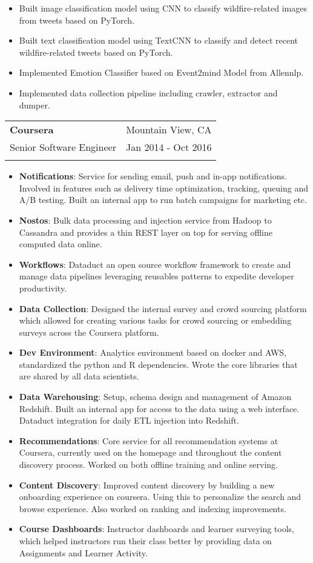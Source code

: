 \documentclass[letterpaper,11pt]{article}
\makeatletter
\newcommand{\resumeItem}[2]{
  \item\small{
    \textbf{#1}{: #2 \vspace{-2pt}}
  }
}
\newcommand{\resumeSubheading}[6]{
  \vspace{-1pt}\item
    \begin{tabular*}{0.97\textwidth}[t]{l@{\extracolsep{\fill}}r}
      \textbf{#1} & #2 \\
      #3 & #4 \\
      \textbf{\textit{#5}} & \textbf{\textit{#6}} \\
    \end{tabular*}\vspace{-5pt}
}
\newcommand{\resumeItemListStart}{\begin{itemize}}
\newcommand{\resumeItemListEnd}{\end{itemize}\vspace{-5pt}}
\makeatother
\begin{document}
        \begin{itemize}
          \item Built image classification model using CNN to classify wildfire-related images from tweets based on PyTorch.
          \item Built text classification model using TextCNN to classify and detect recent wildfire-related tweets based on PyTorch.
          \item Implemented Emotion Classifier based on Event2mind Model from Allennlp.
          \item Implemented data collection pipeline including crawler, extractor and dumper.
        \end{itemize}


    \resumeSubheading
      {Coursera}{Mountain View, CA}
      {Senior Software Engineer}{Jan 2014 - Oct 2016}
      {}{}
      \resumeItemListStart
        \resumeItem{Notifications}
          {Service for sending email, push and in-app notifications. Involved in features such as delivery time optimization, tracking, queuing and A/B testing. Built an internal app to run batch campaigns for marketing etc.}
        \resumeItem{Nostos}
          {Bulk data processing and injection service from Hadoop to Cassandra and provides a thin REST layer on top for serving offline computed data online.}
        \resumeItem{Workflows}
          {Dataduct an open source workflow framework to create and manage data pipelines leveraging reusables patterns to expedite developer productivity.}
        \resumeItem{Data Collection}
          {Designed the internal survey and crowd sourcing platform which allowed for creating various tasks for crowd sourcing or embedding surveys across the Coursera platform.}
        \resumeItem{Dev Environment}
          {Analytics environment based on docker and AWS, standardized the python and R dependencies. Wrote the core libraries that are shared by all data scientists.}
        \resumeItem{Data Warehousing}
          {Setup, schema design and management of Amazon Redshift. Built an internal app for access to the data using a web interface. Dataduct integration for daily ETL injection into Redshift.}
        \resumeItem{Recommendations}
          {Core service for all recommendation systems at Coursera, currently used on the homepage and throughout the content discovery process. Worked on both offline training and online serving.}
        \resumeItem{Content Discovery}
          {Improved content discovery by building a new onboarding experience on coursera. Using this to personalize the search and browse experience. Also worked on ranking and indexing improvements.}
        \resumeItem{Course Dashboards}
          {Instructor dashboards and learner surveying tools, which helped instructors run their class better by providing data on Assignments and Learner Activity.}
      \resumeItemListEnd
\end{document}
